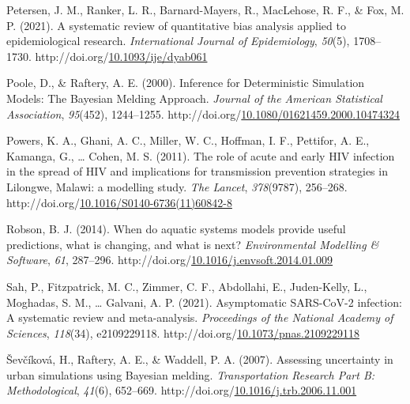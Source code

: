 \documentclass[12pt,twoside]{smiththesis}
\newlength{\cslhangindent}
\newenvironment{CSLReferences}[2] %
 {%
\setlength{\parindent}{0pt}
\ifodd #1 \everypar{\setlength{\hangindent}{\cslhangindent}}\ignorespaces\fi
\ifnum #2 > 0
\setlength{\parskip}{#2\baselineskip}
  \fi
}%
{}
\begin{document}
\begin{CSLReferences}{1}{0}
\leavevmode{}%
Petersen, J. M., Ranker, L. R., Barnard-Mayers, R., MacLehose, R. F., \& Fox, M. P. (2021). A systematic review of quantitative bias analysis applied to epidemiological research. \emph{International Journal of Epidemiology}, \emph{50}(5), 1708--1730. http://doi.org/\href{https://doi.org/10.1093/ije/dyab061}{10.1093/ije/dyab061}

\leavevmode{}%
Poole, D., \& Raftery, A. E. (2000). Inference for Deterministic Simulation Models: The Bayesian Melding Approach. \emph{Journal of the American Statistical Association}, \emph{95}(452), 1244--1255. http://doi.org/\href{https://doi.org/10.1080/01621459.2000.10474324}{10.1080/01621459.2000.10474324}

\leavevmode{}%
Powers, K. A., Ghani, A. C., Miller, W. C., Hoffman, I. F., Pettifor, A. E., Kamanga, G., \ldots{} Cohen, M. S. (2011). The role of acute and early HIV infection in the spread of HIV and implications for transmission prevention strategies in Lilongwe, Malawi: a modelling study. \emph{The Lancet}, \emph{378}(9787), 256--268. http://doi.org/\href{https://doi.org/10.1016/S0140-6736(11)60842-8}{10.1016/S0140-6736(11)60842-8}

\leavevmode{}%
Robson, B. J. (2014). When do aquatic systems models provide useful predictions, what is changing, and what is next? \emph{Environmental Modelling \& Software}, \emph{61}, 287--296. http://doi.org/\href{https://doi.org/10.1016/j.envsoft.2014.01.009}{10.1016/j.envsoft.2014.01.009}

\leavevmode{}%
Sah, P., Fitzpatrick, M. C., Zimmer, C. F., Abdollahi, E., Juden-Kelly, L., Moghadas, S. M., \ldots{} Galvani, A. P. (2021). Asymptomatic SARS-CoV-2 infection: A systematic review and meta-analysis. \emph{Proceedings of the National Academy of Sciences}, \emph{118}(34), e2109229118. http://doi.org/\href{https://doi.org/10.1073/pnas.2109229118}{10.1073/pnas.2109229118}

\leavevmode{}%
Ševčíková, H., Raftery, A. E., \& Waddell, P. A. (2007). Assessing uncertainty in urban simulations using Bayesian melding. \emph{Transportation Research Part B: Methodological}, \emph{41}(6), 652--669. http://doi.org/\href{https://doi.org/10.1016/j.trb.2006.11.001}{10.1016/j.trb.2006.11.001}

\end{CSLReferences}

\end{document}
